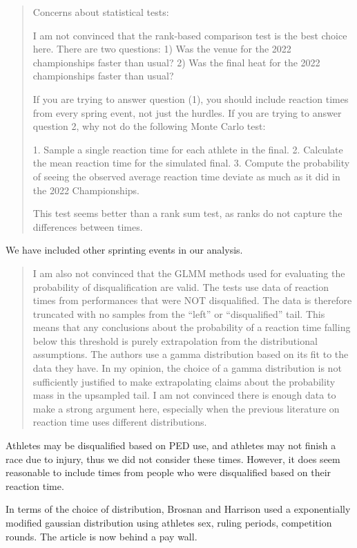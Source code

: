 \documentclass[12pt]{article}
\newenvironment{comment}%
{\begin{quotation}\noindent\small\it\color{darkblue}\ignorespaces%
}{\end{quotation}}
\begin{document}
\begin{comment}
Concerns about statistical tests:

I am not convinced that the rank-based comparison test is the best choice here.
There are two questions: 1) Was the venue for the 2022 championships faster than
usual? 2) Was the final heat for the 2022 championships faster than usual?

If you are trying to answer question (1), you should include reaction times from
every spring event, not just the hurdles. If you are trying to answer question
2, why not do the following Monte Carlo test:

1. Sample a single reaction time for each athlete in the final.
2. Calculate the mean reaction time for the simulated final.
3. Compute the probability of seeing the observed average reaction time deviate
as much as it did in the 2022 Championships.

This test seems better than a rank sum test, as ranks do not capture the
differences between times.

\end{comment}

We have included other sprinting events in our analysis.


\begin{comment}
I am also not convinced that the GLMM methods used for evaluating the
probability of disqualification are valid. The tests use data of reaction times
from performances that were NOT disqualified.  The data is therefore truncated
with no samples from the “left” or “disqualified” tail. This means that any
conclusions about the probability of a reaction time falling below this
threshold is purely extrapolation from the distributional assumptions. The
authors use a gamma distribution based on its fit to the data they have. In my
opinion, the choice of a gamma distribution is not sufficiently justified to
make extrapolating claims about the probability mass in the upsampled tail. I am
not convinced there is enough data to make a strong argument here, especially
when the previous literature on reaction time uses different distributions.
\end{comment}
Athletes may be disqualified based on PED use, and athletes may not finish a race
due to injury, thus we did not consider these times.  However, it does seem
reasonable to include times from people who were disqualified based on their
reaction time.

In terms of the choice of distribution, Brosnan and Harrison used a exponentially
modified gaussian distribution using athletes sex, ruling periods, competition
rounds. The article is now behind a pay wall.
\end{document}
